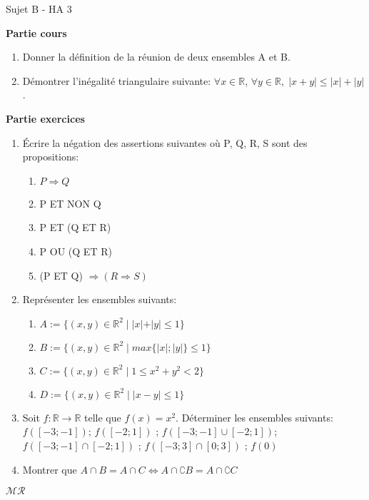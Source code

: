 \documentclass[a4paper,11pt, landscape]{article}
\begin{document}
\begin{multicols*}{2}
\vfill\null
\columnbreak
\centerline{Sujet B - HA 3}

\begin{flushleft}
  \textbf{Partie cours} 
\end{flushleft} 
\begin{enumerate}
  \item Donner la définition de la réunion de deux ensembles A et B.
  \item Démontrer l'inégalité triangulaire suivante: $\forall x \in \mathbb{R}$, $\forall y \in \mathbb{R}, \; |x + y | \leq |x| + |y|$.
\end{enumerate}
\textbf{Partie exercices}
\begin{enumerate}
  \item Écrire la négation des assertions suivantes où P, Q, R, S sont des propositions:
  \begin{enumerate}
    \item $P \Rightarrow Q$
    \item P ET NON Q
    \item P ET (Q ET R)
    \item P OU (Q ET R)
    \item (P ET Q) $\Rightarrow (R \Rightarrow S)$ 
  \end{enumerate}
  \item Représenter les ensembles suivants:
  \begin{enumerate}
    \item $A:= \{(x,y) \in \mathbb{R}^2 \; | \; |x| + |y| \leq 1 \}$
    \item $B:= \{(x,y) \in \mathbb{R}^2 \; | \; max\{|x|; |y|\} \leq 1 \}$
    \item $C:= \{(x,y) \in \mathbb{R}^2 \; | \; 1 \leq x^2 + y^2 < 2 \}$
    \item $D:= \{(x,y) \in \mathbb{R}^2 \; | \; |x-y| \leq 1\}$
  \end{enumerate}
  \item Soit $f: \mathbb{R} \rightarrow \mathbb{R}$ telle que $f(x) = x^2$. Déterminer les ensembles suivants: $f([-3; -1])$; $f([-2;1])$ ; $f([-3;-1] \cup [-2; 1])$; $f([-3;-1] \cap [-2; 1])$ ; $f([-3; 3] \cap [0; 3])$ ; $f({0})$
  \item Montrer que $A \cap B = A \cap C \Leftrightarrow A \cap \complement{B} = A \cap \complement{C}$
\end{enumerate}
\centerline{$\mathcal{MR}$}
\end{multicols*}
\end{document}
